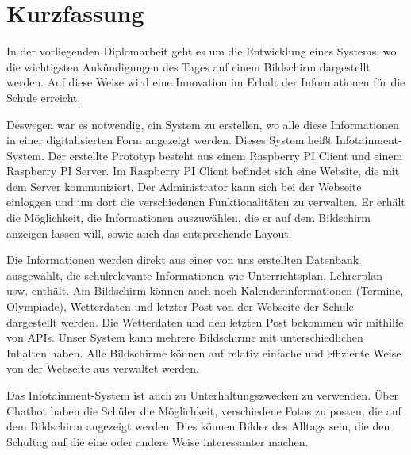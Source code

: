 \chapter*{Kurzfassung}


In der vorliegenden Diplomarbeit geht es um die Entwicklung eines Systems, wo die wichtigsten Ank\"{u}ndigungen des Tages auf einem Bildschirm dargestellt werden. Auf diese Weise wird eine Innovation im Erhalt der Informationen f\"{u}r die Schule erreicht.

Deswegen war es notwendig, ein System zu erstellen, wo alle diese Informationen in einer digitalisierten Form angezeigt werden. Dieses System hei\ss{}t Infotainment-System. Der erstellte Prototyp besteht aus einem Raspberry PI Client und einem Raspberry PI Server. Im Raspberry PI Client befindet sich eine Website, die mit dem Server kommuniziert. Der Administrator kann sich bei der Webseite einloggen und um dort die verschiedenen Funktionalit\"{a}ten zu verwalten. Er erh\"{a}lt die M\"{o}glichkeit, die Informationen auszuw\"{a}hlen, die er auf dem Bildschirm anzeigen lassen will, sowie auch das entsprechende Layout. 

Die Informationen werden direkt aus einer von uns erstellten Datenbank ausgew\"{a}hlt, die schulrelevante Informationen wie Unterrichtsplan, Lehrerplan usw. enth\"{a}lt. Am Bildschirm k\"{o}nnen auch noch Kalenderinformationen (Termine, Olympiade), Wetterdaten und letzter Post von der Webseite der Schule dargestellt werden. Die Wetterdaten und den letzten Post bekommen wir mithilfe von APIs.  
Unser System kann mehrere Bildschirme mit unterschiedlichen Inhalten haben. Alle Bildschirme k\"{o}nnen auf relativ einfache und effiziente Weise von der Webseite aus verwaltet werden.   

Das Infotainment-System ist auch zu Unterhaltungszwecken zu verwenden. \"{U}ber Chatbot haben die Sch\"{u}ler die M\"{o}glichkeit, verschiedene Fotos zu posten, die auf dem Bildschirm angezeigt werden. Dies k\"{o}nnen Bilder des Alltags sein, die den Schultag auf die eine oder andere Weise interessanter machen. 
